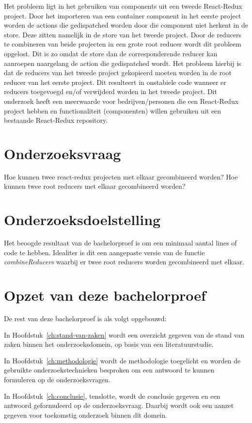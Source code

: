 Het probleem ligt in het gebruiken van components uit een tweede React-Redux project. Door het importeren van een container component in het eerste project worden de actions die gedispatched worden door die component niet herkent in de store. Deze zitten namelijk in de store van het tweede project. Door de reducers te combineren van beide projecten in een grote root reducer wordt dit probleem opgelost. Dit is zo omdat de store dan de corresponderende reducer kan aanroepen naargelang de action die gedispatched wordt. Het probleem hierbij is dat de reducers van het tweede project gekopieerd moeten worden in de root reducer van het eerste project. Dit resulteert in onstabiele code wanneer er reducers toegevoegd en/of verwijderd worden in het tweede project. Dit onderzoek heeft een meerwaarde voor bedrijven/personen die een React-Redux project hebben en functionaliteit (componenten) willen gebruiken uit een bestaande React-Redux repository. 


\section{Onderzoeksvraag}
\label{sec:onderzoeksvraag}
Hoe kunnen twee react-redux projecten met elkaar gecombineerd worden?
Hoe kunnen twee root reducers met elkaar gecombineerd worden?

\section{Onderzoeksdoelstelling}
\label{sec:onderzoeksdoelstelling}
Het beoogde resultaat van de bachelorproef is om een minimaal aantal lines of code te hebben. Idealiter is dit een aangepaste versie van de functie \textit{combineReducers} waarbij er twee root reducers worden gecombineerd met elkaar.

\section{Opzet van deze bachelorproef}
\label{sec:opzet-bachelorproef}


De rest van deze bachelorproef is als volgt opgebouwd:

In Hoofdstuk~\ref{ch:stand-van-zaken} wordt een overzicht gegeven van de stand van zaken binnen het onderzoeksdomein, op basis van een literatuurstudie.

In Hoofdstuk~\ref{ch:methodologie} wordt de methodologie toegelicht en worden de gebruikte onderzoekstechnieken besproken om een antwoord te kunnen formuleren op de onderzoeksvragen.


In Hoofdstuk~\ref{ch:conclusie}, tenslotte, wordt de conclusie gegeven en een antwoord geformuleerd op de onderzoeksvraag. Daarbij wordt ook een aanzet gegeven voor toekomstig onderzoek binnen dit domein.

